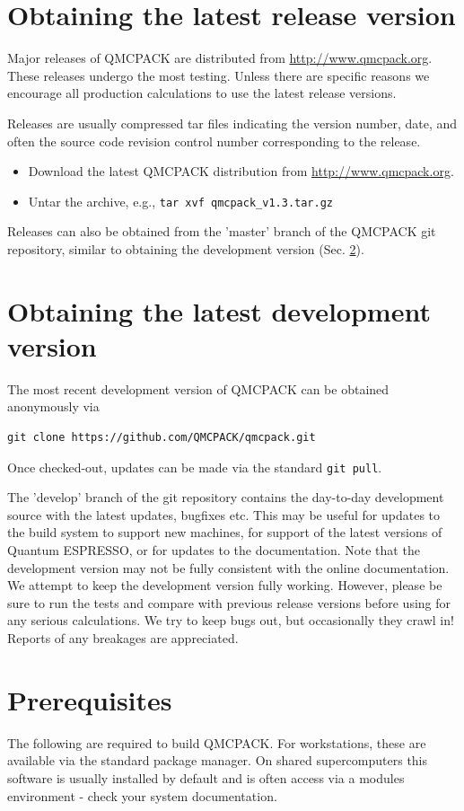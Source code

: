 \section{Obtaining the latest release version}
\label{sec:obrelease}
Major releases of QMCPACK are distributed from
\url{http://www.qmcpack.org}. These releases undergo the most testing. Unless there are
specific reasons we encourage all production calculations to use the
latest release versions.

Releases are usually compressed tar files indicating the version
number, date, and often the source code revision control number
corresponding to the release.

\begin{itemize}
\item Download the latest QMCPACK distribution from \url{http://www.qmcpack.org}.
\item Untar the archive, e.g., \texttt{tar xvf qmcpack\_v1.3.tar.gz}
\end{itemize}

Releases can also be obtained from the 'master' branch of the QMCPACK
git repository, similar to obtaining the development version (Sec. \ref{sec:obdevelopment}).

\section{Obtaining the latest development version}
\label{sec:obdevelopment}
The most recent development version of QMCPACK can be obtained anonymously via
\begin{verbatim}
git clone https://github.com/QMCPACK/qmcpack.git
\end{verbatim}
Once checked-out,
updates can be made via the standard \texttt{git pull}.

The 'develop' branch of the git repository contains the day-to-day development source
with the latest updates, bugfixes etc. This may be useful
for updates to the build system to support new machines, for support
of the latest versions of Quantum ESPRESSO, or for updates to the
documentation.  Note that the development version may not be fully
consistent with the online documentation.  We attempt to keep
the development version fully working. However, please be sure to run the tests and
compare with previous release versions before using for any serious
calculations. We try to keep bugs out, but occasionally they crawl
in! Reports of any breakages are appreciated.

\section{Prerequisites}
\label{sec:prerequisites}
The following are required to build QMCPACK. For workstations, these are available via the standard
package manager. On shared supercomputers this software is usually
installed by default and is often
access via a modules environment - check your system
documentation.

